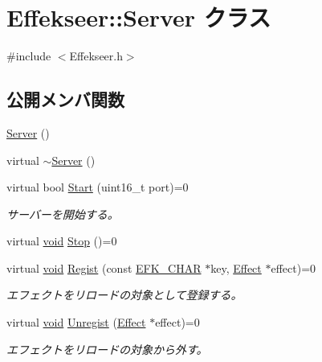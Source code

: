 \hypertarget{class_effekseer_1_1_server}{}\section{Effekseer\+:\+:Server クラス}
\label{class_effekseer_1_1_server}


{\ttfamily \#include $<$Effekseer.\+h$>$}

\subsection*{公開メンバ関数}
\begin{DoxyCompactItemize}
\item 
\mbox{\hyperlink{class_effekseer_1_1_server_af6f7a1893fb9dfe2d65a9288698e3f5a}{Server}} ()
\item 
virtual \mbox{\hyperlink{class_effekseer_1_1_server_a492364188996ee80d8baa9cba8e443d3}{$\sim$\+Server}} ()
\item 
virtual bool \mbox{\hyperlink{class_effekseer_1_1_server_afd333e58d1330710673caf909452a4c1}{Start}} (uint16\+\_\+t port)=0
\begin{DoxyCompactList}\small\item\em サーバーを開始する。 \end{DoxyCompactList}\item 
virtual \mbox{\hyperlink{namespace_effekseer_ab34c4088e512200cf4c2716f168deb56}{void}} \mbox{\hyperlink{class_effekseer_1_1_server_ac41b09333e7d792489cbeef127df89f6}{Stop}} ()=0
\item 
virtual \mbox{\hyperlink{namespace_effekseer_ab34c4088e512200cf4c2716f168deb56}{void}} \mbox{\hyperlink{class_effekseer_1_1_server_aadfbaeb38b0d1fb33ad6646430de45b0}{Regist}} (const \mbox{\hyperlink{_effekseer_8h_a50b026abea014b47854bcd835b3b6233}{E\+F\+K\+\_\+\+C\+H\+AR}} $\ast$key, \mbox{\hyperlink{class_effekseer_1_1_effect}{Effect}} $\ast$effect)=0
\begin{DoxyCompactList}\small\item\em エフェクトをリロードの対象として登録する。 \end{DoxyCompactList}\item 
virtual \mbox{\hyperlink{namespace_effekseer_ab34c4088e512200cf4c2716f168deb56}{void}} \mbox{\hyperlink{class_effekseer_1_1_server_a81f7cfeac861a665a6d2905400735740}{Unregist}} (\mbox{\hyperlink{class_effekseer_1_1_effect}{Effect}} $\ast$effect)=0
\begin{DoxyCompactList}\small\item\em エフェクトをリロードの対象から外す。 \end{DoxyCompactList}\item 

\end{DoxyCompactItemize}
